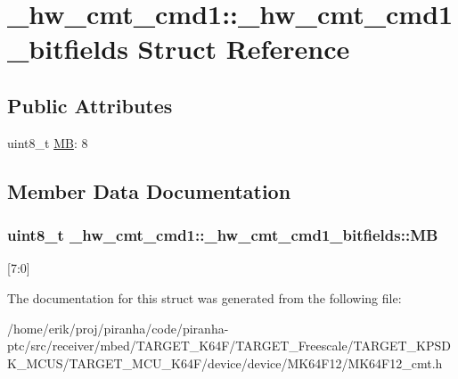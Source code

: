 \hypertarget{struct__hw__cmt__cmd1_1_1__hw__cmt__cmd1__bitfields}{}\section{\+\_\+hw\+\_\+cmt\+\_\+cmd1\+:\+:\+\_\+hw\+\_\+cmt\+\_\+cmd1\+\_\+bitfields Struct Reference}
\label{struct__hw__cmt__cmd1_1_1__hw__cmt__cmd1__bitfields}
\subsection*{Public Attributes}
\begin{DoxyCompactItemize}
\item 
uint8\+\_\+t \hyperlink{struct__hw__cmt__cmd1_1_1__hw__cmt__cmd1__bitfields_ae332510ca1ae865a90db10ad02caf4df}{MB}\+: 8
\end{DoxyCompactItemize}


\subsection{Member Data Documentation}
\subsubsection[{\texorpdfstring{MB}{MB}}]{\setlength{\rightskip}{0pt plus 5cm}uint8\+\_\+t \+\_\+hw\+\_\+cmt\+\_\+cmd1\+::\+\_\+hw\+\_\+cmt\+\_\+cmd1\+\_\+bitfields\+::\+MB}\hypertarget{struct__hw__cmt__cmd1_1_1__hw__cmt__cmd1__bitfields_ae332510ca1ae865a90db10ad02caf4df}{}\label{struct__hw__cmt__cmd1_1_1__hw__cmt__cmd1__bitfields_ae332510ca1ae865a90db10ad02caf4df}
\mbox{[}7\+:0\mbox{]} 

The documentation for this struct was generated from the following file\+:\begin{DoxyCompactItemize}
\item 
/home/erik/proj/piranha/code/piranha-\/ptc/src/receiver/mbed/\+T\+A\+R\+G\+E\+T\+\_\+\+K64\+F/\+T\+A\+R\+G\+E\+T\+\_\+\+Freescale/\+T\+A\+R\+G\+E\+T\+\_\+\+K\+P\+S\+D\+K\+\_\+\+M\+C\+U\+S/\+T\+A\+R\+G\+E\+T\+\_\+\+M\+C\+U\+\_\+\+K64\+F/device/device/\+M\+K64\+F12/M\+K64\+F12\+\_\+cmt.\+h\end{DoxyCompactItemize}

